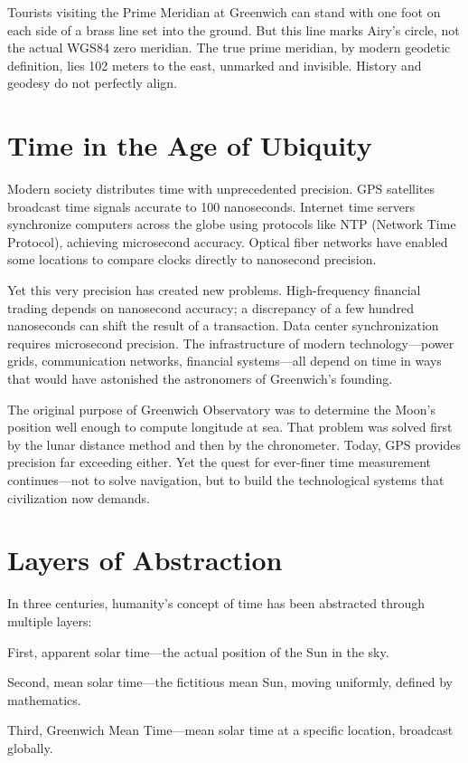 Tourists visiting the Prime Meridian at Greenwich can stand with one foot on each side of a brass line set into the ground. But this line marks Airy's circle, not the actual WGS84 zero meridian. The true prime meridian, by modern geodetic definition, lies 102 meters to the east, unmarked and invisible. History and geodesy do not perfectly align.

\section{Time in the Age of Ubiquity}

Modern society distributes time with unprecedented precision. GPS satellites broadcast time signals accurate to 100 nanoseconds. Internet time servers synchronize computers across the globe using protocols like NTP (Network Time Protocol), achieving microsecond accuracy. Optical fiber networks have enabled some locations to compare clocks directly to nanosecond precision.

Yet this very precision has created new problems. High-frequency financial trading depends on nanosecond accuracy; a discrepancy of a few hundred nanoseconds can shift the result of a transaction. Data center synchronization requires microsecond precision. The infrastructure of modern technology—power grids, communication networks, financial systems—all depend on time in ways that would have astonished the astronomers of Greenwich's founding.

The original purpose of Greenwich Observatory was to determine the Moon's position well enough to compute longitude at sea. That problem was solved first by the lunar distance method and then by the chronometer. Today, GPS provides precision far exceeding either. Yet the quest for ever-finer time measurement continues—not to solve navigation, but to build the technological systems that civilization now demands.

\section{Layers of Abstraction}

In three centuries, humanity's concept of time has been abstracted through multiple layers:

First, apparent solar time—the actual position of the Sun in the sky.

Second, mean solar time—the fictitious mean Sun, moving uniformly, defined by mathematics.

Third, Greenwich Mean Time—mean solar time at a specific location, broadcast globally.

